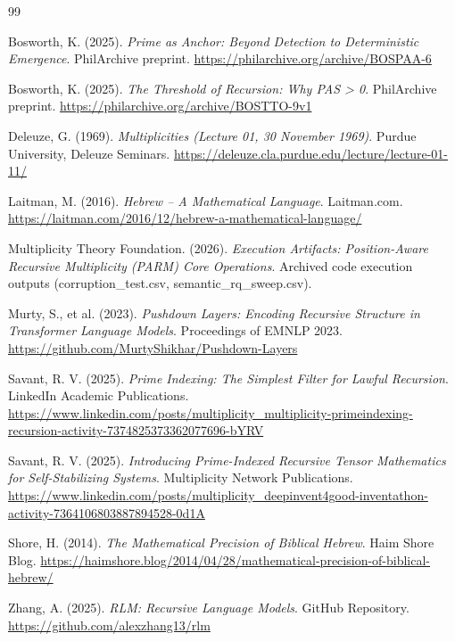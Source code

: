 \documentclass[11pt]{article}
\begin{document}
\begin{thebibliography}{99}

Bosworth, K. (2025).
\textit{Prime as Anchor: Beyond Detection to Deterministic Emergence}.
PhilArchive preprint. \url{https://philarchive.org/archive/BOSPAA-6}

Bosworth, K. (2025).
\textit{The Threshold of Recursion: Why PAS > 0}.
PhilArchive preprint. \url{https://philarchive.org/archive/BOSTTO-9v1}

Deleuze, G. (1969).
\textit{Multiplicities (Lecture 01, 30 November 1969)}.
Purdue University, Deleuze Seminars. \url{https://deleuze.cla.purdue.edu/lecture/lecture-01-11/}

Laitman, M. (2016).
\textit{Hebrew – A Mathematical Language}.
Laitman.com. \url{https://laitman.com/2016/12/hebrew-a-mathematical-language/}

Multiplicity Theory Foundation. (2026).
\textit{Execution Artifacts: Position-Aware Recursive Multiplicity (PARM) Core Operations}.
Archived code execution outputs (corruption\_test.csv, semantic\_rq\_sweep.csv).

Murty, S., et al. (2023).
\textit{Pushdown Layers: Encoding Recursive Structure in Transformer Language Models}.
Proceedings of EMNLP 2023. \url{https://github.com/MurtyShikhar/Pushdown-Layers}

Savant, R. V. (2025).
\textit{Prime Indexing: The Simplest Filter for Lawful Recursion}.
LinkedIn Academic Publications. \url{https://www.linkedin.com/posts/multiplicity_multiplicity-primeindexing-recursion-activity-7374825373362077696-bYRV}

Savant, R. V. (2025).
\textit{Introducing Prime-Indexed Recursive Tensor Mathematics for Self-Stabilizing Systems}.
Multiplicity Network Publications. \url{https://www.linkedin.com/posts/multiplicity_deepinvent4good-inventathon-activity-7364106803887894528-0d1A}

Shore, H. (2014).
\textit{The Mathematical Precision of Biblical Hebrew}.
Haim Shore Blog. \url{https://haimshore.blog/2014/04/28/mathematical-precision-of-biblical-hebrew/}

Zhang, A. (2025).
\textit{RLM: Recursive Language Models}.
GitHub Repository. \url{https://github.com/alexzhang13/rlm}

\end{thebibliography}
\end{document}
